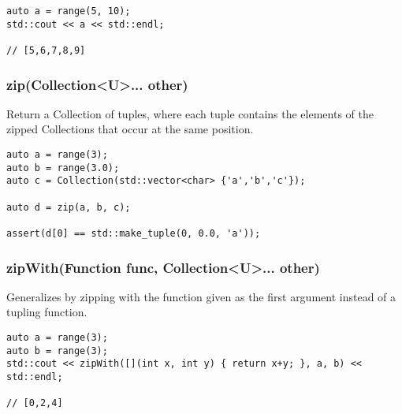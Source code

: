 \begin{lstlisting}[title=example]
auto a = range(5, 10);
std::cout << a << std::endl;

// [5,6,7,8,9]
\end{lstlisting}





\subsubsection{zip(Collection<U>... other)}

Return a Collection of tuples, where each tuple contains the elements of the zipped Collections that occur at the same position.

\begin{lstlisting}[title=example]
auto a = range(3);
auto b = range(3.0);
auto c = Collection(std::vector<char> {'a','b','c'});

auto d = zip(a, b, c);

assert(d[0] == std::make_tuple(0, 0.0, 'a'));
\end{lstlisting}




\subsubsection{zipWith(Function func, Collection<U>... other)}
Generalizes  by zipping with the function given as the first argument instead of a tupling function.

\begin{lstlisting}[title=example]
auto a = range(3);
auto b = range(3);
std::cout << zipWith([](int x, int y) { return x+y; }, a, b) << std::endl;

// [0,2,4]
\end{lstlisting}


